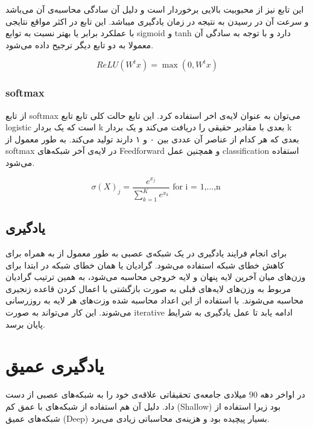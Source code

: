 \documentclass[12pt, a4paper, oneside]{report}
\begin{document}
این تابع نیز از محبوبیت بالایی برخوردار است و دلیل آن سادگی محاسبه‌ی آن می‌باشد و سرعت آن در رسیدن به نتیجه در زمان
یادگیری میباشد. این تابع در اکثر مواقع نتایجی با عملکرد برابر یا بهتر نسبت به توابع
sigmoid
و
tanh
دارد و با توجه به سادگی آن معمولا به دو تابع دیگر ترجیح داده می‌شود.

\begin{equation}
    ReLU(W^tx) = \max(0, W^tx)
\label{formula:relu}
\end{equation}

\subsubsection{softmax}

از تابع
softmax
می‌توان به عنوان
لایه‌ی اخر استفاده کرد. این تابع حالت کلی تابع تابع
logistic
است که یک بردار
k
بعدی با مقادیر حقیقی را دریافت می‌کند و یک بردار
k
بعدی که هر کدام از عناصر آن عددی بین ۰ و ۱ دارند تولید می‌کند. به طور معمول از
softmax
در لایه‌ی آخر شبکه‌های
Feedforward
و همچنین عمل
classification
استفاده می‌شود.

\begin{equation}
   \sigma(X)_j = \dfrac{e^{x_j}}{\sum_{k = 1}^{K} e^{x_k} }  \mbox{ for i = 1,...,n }
\label{formula:softmax}
\end{equation}

\subsection{یادگیری}

برای انجام فرایند یادگیری در یک شبکه‌ی عصبی به طور معمول از
به همراه
برای کاهش خطای شبکه استفاده می‌شود. گرادیان
یا همان خطای شبکه در ابتدا برای وزن‌های میان آخرین لایه پنهان و لایه خروجی محاسبه می‌شود، به همین ترتیب گرادیان
مربوط به وزن‌های لایه‌های قبلی به صورت بازگشتی با اعمال کردن قاعده زنجیری محاسبه می‌شوند.
با استفاده از این اعداد محاسبه شده وزت‌های هر لایه به روزرسانی می‌شوند. این کار می‌تواند به صورت
iterative
ادامه یابد تا عمل یادگیری به شرایط پایان برسد.

\section{یادگیری عمیق}
در اواخر دهه 90 میلادی جامعه‌ی تحقیقاتی علاقه‌ی خود را به شبکه‌های عصبی از دست داد. دلیل آن هم استفاده از شبکه‌های
با عمق کم
(Shallow)
بود زیرا استفاده از شبکه‌های عمیق
(Deep)
بسیار پیچیده بود و هزینه‌ی محاسباتی زیادی می‌برد.
\end{document}
